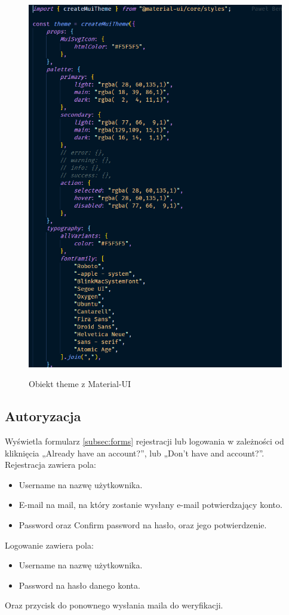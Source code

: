 \documentclass[a4paper,11pt]{report}
\begin{document}
\begin{figure}[H]
	\centering
	\includegraphics[scale=0.5]{implementacja/frontend/custom_theme}\\
	\caption{Obiekt theme z Material-UI}
	\label{fig:custom_theme}
\end{figure}

\subsection{Autoryzacja}
Wyświetla formularz \ref{subsec:forms} rejestracji lub logowania w zależności od kliknięcia „Already have an account?”, lub „Don't have and account?”.
Rejestracja zawiera pola:
\begin{itemize}
	\item Username na nazwę użytkownika.
	\item E-mail na mail, na który zostanie wysłany e-mail potwierdzający konto.
	\item Password oraz Confirm password na hasło, oraz jego potwierdzenie.
\end{itemize}
Logowanie zawiera pola:
\begin{itemize}
	\item Username na nazwę użytkownika.
	\item Password na hasło danego konta.
\end{itemize}
Oraz przycisk do ponownego wysłania maila do weryfikacji.
\end{document}
